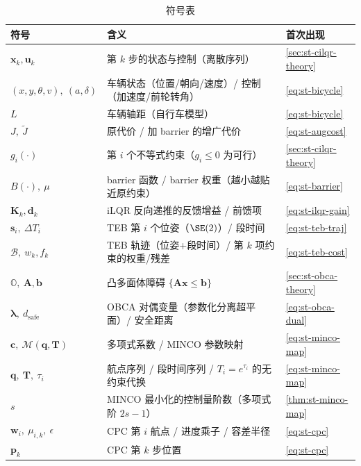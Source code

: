 \begin{table}[H]\centering\small
\caption{符号表}
\label{tab:st-symbols}
\begin{tabular}{lll}
\toprule
符号 & 含义 & 首次出现 \\
\midrule
$\mathbf x_k,\mathbf u_k$ & 第 $k$ 步的状态与控制（离散序列） & \cref{sec:st-cilqr-theory} \\
$(x,y,\theta,v),\ (a,\delta)$ & 车辆状态（位置/朝向/速度）/ 控制（加速度/前轮转角） & \cref{eq:st-bicycle} \\
$L$ & 车辆轴距（自行车模型） & \cref{eq:st-bicycle} \\
$J,\ \tilde J$ & 原代价 / 加 barrier 的增广代价 & \cref{eq:st-augcost} \\
$g_i(\cdot)$ & 第 $i$ 个不等式约束（$g_i\le 0$ 为可行） & \cref{sec:st-cilqr-theory} \\
$B(\cdot),\ \mu$ & barrier 函数 / barrier 权重（越小越贴近原约束） & \cref{eq:st-barrier} \\
$\mathbf K_k,\mathbf d_k$ & iLQR 反向递推的反馈增益 / 前馈项 & \cref{eq:st-ilqr-gain} \\
$\mathbf s_i,\ \Delta T_i$ & TEB 第 $i$ 个位姿（$\SE(2)$）/ 段时间 & \cref{eq:st-teb-traj} \\
$\mathcal B,\ w_k,f_k$ & TEB 轨迹（位姿+段时间）/ 第 $k$ 项约束的权重/残差 & \cref{eq:st-teb-cost} \\
$\mathbb O,\ \mathbf A,\mathbf b$ & 凸多面体障碍 $\{\mathbf A\mathbf x\le\mathbf b\}$ & \cref{sec:st-obca-theory} \\
$\boldsymbol\lambda,\ d_{\text{safe}}$ & OBCA 对偶变量（参数化分离超平面）/ 安全距离 & \cref{eq:st-obca-dual} \\
$\mathbf c,\ \mathcal M(\mathbf q,\mathbf T)$ & 多项式系数 / MINCO 参数映射 & \cref{eq:st-minco-map} \\
$\mathbf q,\ \mathbf T,\ \tau_i$ & 航点序列 / 段时间序列 / $T_i=e^{\tau_i}$ 的无约束代换 & \cref{eq:st-minco-map} \\
$s$ & MINCO 最小化的控制量阶数（多项式阶 $2s-1$） & \cref{thm:st-minco-map} \\
$\mathbf w_i,\ \mu_{i,k},\ \epsilon$ & CPC 第 $i$ 航点 / 进度乘子 / 容差半径 & \cref{eq:st-cpc} \\
$\mathbf p_k$ & CPC 第 $k$ 步位置 & \cref{eq:st-cpc} \\
\bottomrule
\end{tabular}
\end{table}

